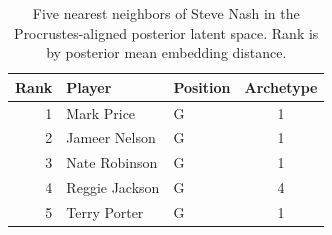 \begin{table}[htbp]
  \centering\small
  \begin{tabular}{rllc}
    \toprule
    Rank & Player & Position & Archetype \\
    \midrule
    1 & Mark Price & G & 1 \\
    2 & Jameer Nelson & G & 1 \\
    3 & Nate Robinson & G & 1 \\
    4 & Reggie Jackson & G & 4 \\
    5 & Terry Porter & G & 1 \\
    \bottomrule
  \end{tabular}
  \caption{Five nearest neighbors of Steve Nash in the Procrustes-aligned posterior latent space. Rank is by posterior mean embedding distance.}
  \label{tab:Steve_Nash_neighbors}
\end{table}

